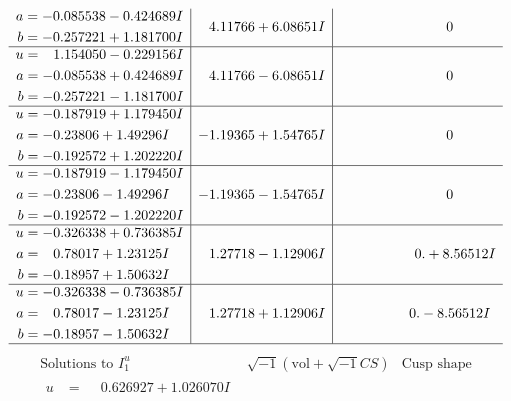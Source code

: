 \documentclass[1p]{elsarticle_modified}
\theoremstyle{definition}
\newcommand{\I}{\sqrt{-1}}
\begin{document}
$$\begin{array}{c|c|c}
\begin{aligned}
a &= -0.085538 - 0.424689 I \\
b &= -0.257221 + 1.181700 I\end{aligned}
 & \phantom{-}4.11766 + 6.08651 I & \phantom{-0.000000 } 0 \\ \hline\begin{aligned}
u &= \phantom{-}1.154050 - 0.229156 I \\
a &= -0.085538 + 0.424689 I \\
b &= -0.257221 - 1.181700 I\end{aligned}
 & \phantom{-}4.11766 - 6.08651 I & \phantom{-0.000000 } 0 \\ \hline\begin{aligned}
u &= -0.187919 + 1.179450 I \\
a &= -0.23806 + 1.49296 I \\
b &= -0.192572 + 1.202220 I\end{aligned}
 & -1.19365 + 1.54765 I & \phantom{-0.000000 } 0 \\ \hline\begin{aligned}
u &= -0.187919 - 1.179450 I \\
a &= -0.23806 - 1.49296 I \\
b &= -0.192572 - 1.202220 I\end{aligned}
 & -1.19365 - 1.54765 I & \phantom{-0.000000 } 0 \\ \hline\begin{aligned}
u &= -0.326338 + 0.736385 I \\
a &= \phantom{-}0.78017 + 1.23125 I \\
b &= -0.18957 + 1.50632 I\end{aligned}
 & \phantom{-}1.27718 - 1.12906 I & \phantom{-0.000000 -}0. + 8.56512 I \\ \hline\begin{aligned}
u &= -0.326338 - 0.736385 I \\
a &= \phantom{-}0.78017 - 1.23125 I \\
b &= -0.18957 - 1.50632 I\end{aligned}
 & \phantom{-}1.27718 + 1.12906 I & \phantom{-0.000000 } 0. - 8.56512 I\\
 \hline 
 \end{array}$$\newpage$$\begin{array}{c|c|c}  
\text{Solutions to }I^u_{1}& \I (\text{vol} + \sqrt{-1}CS) & \text{Cusp shape}\\
 \hline 
\begin{aligned}
u &= \phantom{-}0.626927 + 1.026070 I \\

\end{aligned}
\end{array}$$
\end{document}
